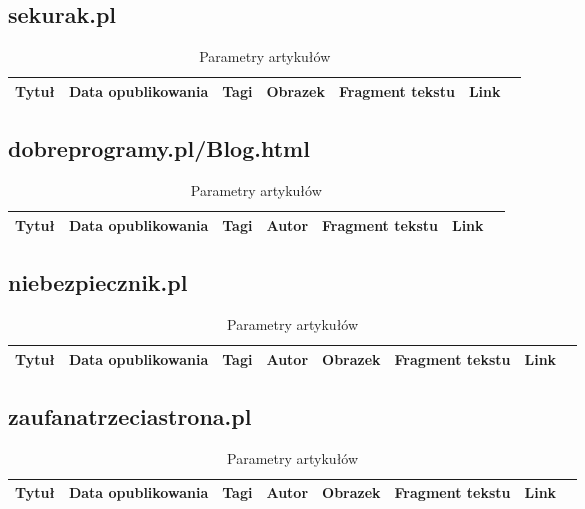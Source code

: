 \documentclass[12pt, titlepage]{article}
\begin{document}
		\subsection{sekurak.pl}
		\begin{table}[H]
			\centering
			\caption{Parametry artykułów}
			\label{sekurak_parametry}
			\begin{tabular}{ | C{2cm} | C{4cm} | C{2cm} | C{2cm} | C{3cm} | C{2cm} | @{}m{0pt}@{}}
				\hline
				Tytuł & Data opublikowania & Tagi & Obrazek & Fragment tekstu & Link &\\[0.5cm]
				\hline
			\end{tabular}
		\end{table}

		\subsection{dobreprogramy.pl/Blog.html} 
		\begin{table}[H]
			\centering
			\caption{Parametry artykułów}
			\label{dobreprogramy_parametry}
			\begin{tabular}{ | C{2cm} | C{4cm} | C{2cm} | C{2cm} | C{3cm} | C{2cm} | @{}m{0pt}@{}}
				\hline
				Tytuł & Data opublikowania & Tagi & Autor & Fragment tekstu & Link &\\[0.5cm]
				\hline
			\end{tabular}
		\end{table}
		\subsection{niebezpiecznik.pl} 
		\begin{table}[H]
			\centering
			\caption{Parametry artykułów}
			\label{niebezpiecznik_parametry}
			\begin{tabular}{ | C{1.5cm} | C{4cm} | C{1.5cm} | C{1.5cm} | C{1.5cm} | C{3cm} | C{1.5cm} | @{}m{0pt}@{}}
				\hline
				Tytuł & Data opublikowania & Tagi & Autor & Obrazek & Fragment tekstu & Link &\\[0.5cm]
				\hline
			\end{tabular}
		\end{table}
		\subsection{zaufanatrzeciastrona.pl} 
		\begin{table}[H]
			\centering
			\caption{Parametry artykułów}
			\label{z3s_parametry}
			\begin{tabular}{ | C{1.5cm} | C{4cm} | C{1.5cm} | C{1.5cm} | C{1.5cm} | C{3cm} | C{1.5cm} | @{}m{0pt}@{}}
				\hline
				Tytuł & Data opublikowania & Tagi & Autor & Obrazek & Fragment tekstu & Link &\\[0.5cm]
				\hline
			\end{tabular}
		\end{table}
\end{document}
